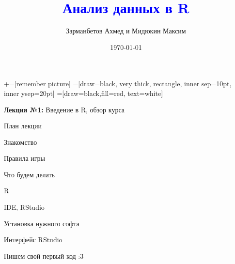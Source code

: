 \documentclass[notes,12pt, aspectratio=169]{beamer}
\title[]{\textcolor{blue}{Анализ данных в R}}
\author{Зарманбетов Ахмед и Мидюкин Максим}
\date{\today}
\newenvironment{wideitemize}{\itemize\addtolength{\itemsep}{10pt}}{\enditemize}
\begin{document}
\newcommand\marktopleft[1]{%
    \tikz[overlay,remember picture] 
        \node (marker-#1-a) at (-.3em,.3em) {};%
}
\newcommand\markbottomright[2]{%
    \tikz[overlay,remember picture] 
        \node (marker-#1-b) at (0em,0em) {};%
}
+=[remember picture] 
 =[draw=black, very thick, rectangle, inner sep=10pt, inner ysep=20pt]
 =[draw=black,fill=red, text=white]


\begin{frame}
\maketitle
\centering \textbf{\color{blue} Лекция №1:}  Введение в R, обзор курса
\end{frame}

\begin{frame}{План лекции}
\begin{wideitemize}
	
	\item Знакомство

	\item Правила игры
	
	\item Что будем делать
	
	\item R
	
	\item IDE, RStudio
	
	\item Установка нужного софта
	
	\item Интерфейс RStudio
	
	\item Пишем свой первый код :3
		
\end{wideitemize} 
\end{frame}
\end{document}

